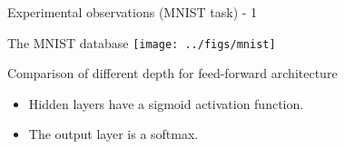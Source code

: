 %
%


\begin{frame}{Experimental observations (MNIST task) - 1}
  \begin{block}{The MNIST database}
    \texttt{[image: ../figs/mnist]}
  \end{block}
  \begin{block}{Comparison of different depth for feed-forward architecture}
     \begin{center}
      \begin{itemize}
      \item Hidden layers have a sigmoid activation function.
      \item The output layer is a softmax.
      \end{itemize}
  \end{center}
  \end{block}
\end{frame}

